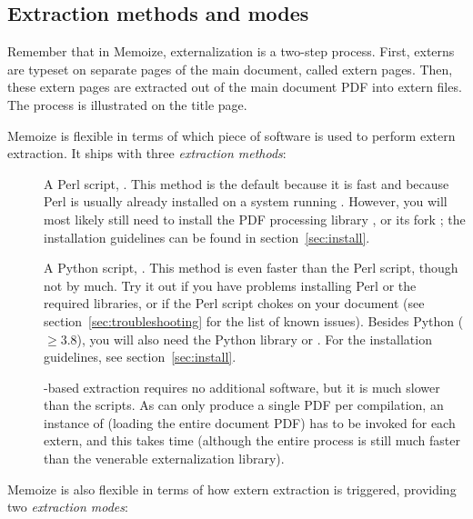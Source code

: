 \documentclass[a4paper,11pt]{article}
\begin{document}
\subsection{Extraction methods and modes}
\label{sec:extraction}

Remember that in Memoize, externalization is a two-step process.  First,
externs are typeset on separate pages of the main document, called extern
pages.  Then, these extern pages are extracted out of the main document PDF
into extern files.  The process is illustrated on the title page.

Memoize is flexible in terms of which piece of software is used to perform
extern extraction.  It ships with three \emph{extraction methods}:

\begin{description}
\item[] A Perl script, .
  This method is the default because it is fast and because Perl is usually
  already installed on a system running .  However, you will most
  likely still need to install the PDF processing library
  , or its fork
  ; the
  installation guidelines can be found in section~\ref{sec:install}.
\item[] A Python script, .
  This method is even faster than the Perl script, though not by much.  Try it
  out if you have problems installing Perl or the required libraries, or if the
  Perl script chokes on your document (see section~\ref{sec:troubleshooting}
  for the list of known issues).  Besides Python ($\geq 3.8$), you will also
  need the Python library  or
  .  For the installation
  guidelines, see section~\ref{sec:install}.
\item[] -based extraction requires no
  additional software, but it is much slower than the scripts.  As 
  can only produce a single PDF per compilation, an instance of 
  (loading the entire document PDF) has to be invoked for each extern, and this
  takes time (although the entire process is still much faster than the
  venerable \TikZ externalization library).
\end{description}

Memoize is also flexible in terms of how extern extraction is triggered,
providing two \emph{extraction modes}:
\end{document}
